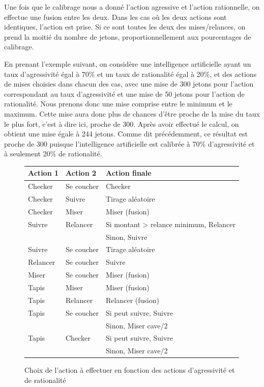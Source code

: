\documentclass{report}
\begin{document}
Une fois que le calibrage nous a donné l'action agressive et l'action rationnelle, on effectue une fusion entre les deux. Dans les cas où les deux actions sont identiques, l'action est prise. Si ce sont toutes les deux des mises/relances, on prend la moitié du nombre de jetons, proportionnellement aux pourcentages de calibrage.


En prenant l'exemple suivant, on considère une intelligence artificielle ayant un taux d'agressivité égal à  70\% et un taux de rationalité égal à 20\%, et des actions de mises choisies dans chacun des cas, avec une mise de 300 jetons pour l'action correspondant au taux d'agressivité et une mise de 50 jetons pour l'action de rationalité. Nous prenons donc une mise comprise entre le minimum et le maximum. Cette mise aura donc plus de chances d'être proche de la mise du taux le plus fort, c'est à dire ici, proche de 300. Après avoir effectué le calcul, on obtient une mise égale à 244 jetons. Comme dit précédemment, ce résultat est proche de 300 puisque l'intelligence artificielle est calibrée à 70\% d'agressivité et à seulement 20\% de rationalité.

\begin{figure}[H]
\begin{center}
\begin{tabular}{|l|l|l|}
	\hline
	Action 1		&	Action 2 	&	Action finale\\
	\hline
	Checker		&	Se coucher	&	Checker\\
	\hline
	Checker		&	Suivre		&	Tirage aléatoire\\
	\hline
	Checker		&	Miser		&	Miser (fusion)\\
	\hline
	Suivre		&	Relancer		&	Si montant > relance minimum, Relancer\\
				&				&		Sinon, Suivre\\
	\hline
	Suivre		&	Se coucher	&	Tirage aléatoire\\
	\hline
	Relancer		&	Se coucher	&	Suivre\\
	\hline
	Miser		&	Se coucher	&	Miser (fusion)\\
	\hline
	Tapis		&	Miser		&	Miser (fusion)\\
	\hline
	Tapis		&	Relancer		&	Relancer (fusion)\\
	\hline
	Tapis		&	Se coucher	&	Si peut suivre, Suivre\\
				&				&	Sinon, Miser cave/2\\
	\hline
	Tapis		&	Checker		&	Si peut suivre, Suivre\\
				&				&   Sinon, Miser cave/2\\
	\hline
\end{tabular}
\end{center}
\caption{Choix de l'action à effectuer en fonction des actions d'agressivité et de rationalité}
\end{figure}
\end{document}
